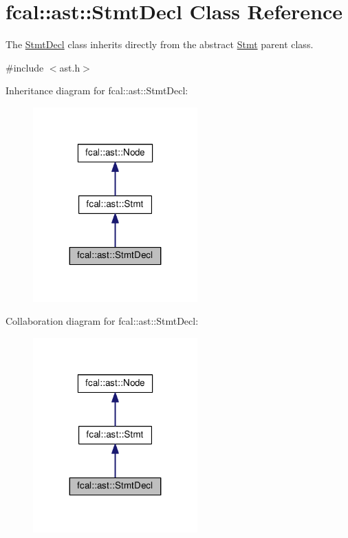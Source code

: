 \hypertarget{classfcal_1_1ast_1_1StmtDecl}{}\section{fcal\+:\+:ast\+:\+:Stmt\+Decl Class Reference}
\label{classfcal_1_1ast_1_1StmtDecl}


The \hyperlink{classfcal_1_1ast_1_1StmtDecl}{Stmt\+Decl} class inherits directly from the abstract \hyperlink{classfcal_1_1ast_1_1Stmt}{Stmt} parent class.  




{\ttfamily \#include $<$ast.\+h$>$}



Inheritance diagram for fcal\+:\+:ast\+:\+:Stmt\+Decl\+:\nopagebreak
\begin{figure}[H]
\begin{center}
\leavevmode
\includegraphics[width=179pt]{classfcal_1_1ast_1_1StmtDecl__inherit__graph}
\end{center}
\end{figure}


Collaboration diagram for fcal\+:\+:ast\+:\+:Stmt\+Decl\+:\nopagebreak
\begin{figure}[H]
\begin{center}
\leavevmode
\includegraphics[width=179pt]{classfcal_1_1ast_1_1StmtDecl__coll__graph}
\end{center}
\end{figure}
